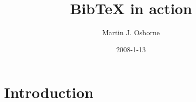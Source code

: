 \documentclass[12pt]{article}
\begin{document}
\title{BibTeX in action}
\author{Martin J. Osborne}
\date{2008-1-13}

\maketitle

\section{Introduction}


\cite{RTutorial1}
\cite{RTutorial2}





\end{document}
